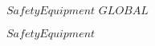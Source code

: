 \begin{vdm}\kClass $SafetyEquipment$ \kISO $GLOBAL$
\par
\kInstanceVarDef
\parlinebr
\begin{insvar}
\end{insvar}
\par
\kEnd $SafetyEquipment$

\end{vdm}























